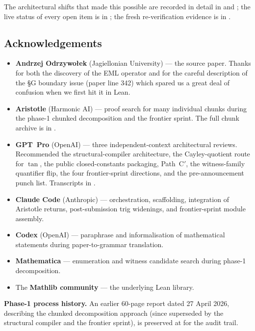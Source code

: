 \documentclass[11pt,a4paper]{article}
\theoremstyle{plain}
\theoremstyle{definition}
\begin{document}
The architectural shifts that made this possible are recorded in
detail in  and
; the live status of every open item
is in ; the fresh re-verification evidence is
in .

\subsection*{Acknowledgements}

\begin{itemize}[leftmargin=*, topsep=2pt, itemsep=1pt]
  \item \textbf{Andrzej Odrzywo\l{}ek} (Jagiellonian University) ---
    the source paper. Thanks for both the discovery of the EML
    operator and for the careful description of the §G boundary issue
    (paper line 342) which spared us a great deal of confusion when
    we first hit it in Lean.
  \item \textbf{Aristotle} (Harmonic AI) --- proof search for many
    individual chunks during the phase-1 chunked decomposition and
    the frontier sprint. The full chunk archive is in
    .
  \item \textbf{GPT~Pro} (OpenAI) --- three independent-context
    architectural reviews. Recommended the structural-compiler
    architecture, the Cayley-quotient route for $\tan$, the public
    closed-constants packaging, Path~C$'$, the witness-family
    quantifier flip, the four frontier-sprint directions, and the
    pre-announcement punch list. Transcripts in
    .
  \item \textbf{Claude Code} (Anthropic) --- orchestration,
    scaffolding, integration of Aristotle returns, post-submission
    trig widenings, and frontier-sprint module assembly.
  \item \textbf{Codex} (OpenAI) --- paraphrase and informalisation
    of mathematical statements during paper-to-grammar translation.
  \item \textbf{Mathematica} --- enumeration and witness candidate
    search during phase-1 decomposition.
  \item The \textbf{Mathlib community} --- the underlying Lean
    library.
\end{itemize}

\noindent\textbf{Phase-1 process history.} An earlier
$60$-page report dated 27 April 2026, describing the chunked
decomposition approach (since superseded by the structural compiler
and the frontier sprint), is preserved at
 for the audit trail.
\end{document}
